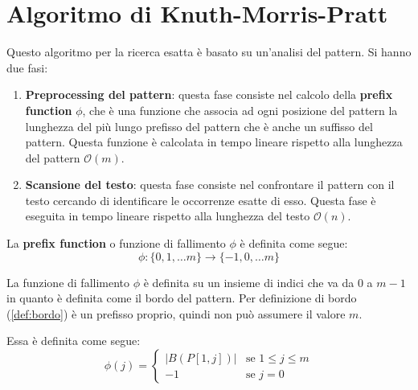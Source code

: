 \section{Algoritmo di Knuth-Morris-Pratt}
Questo algoritmo per la ricerca esatta è basato su un'analisi del pattern. Si
hanno due fasi:
\begin{enumerate}
    \item \textbf{Preprocessing del pattern}: questa fase consiste nel calcolo
          della \textbf{prefix function} $\phi$, che è una funzione che associa
          ad ogni posizione del pattern la lunghezza del più lungo prefisso del
          pattern che è anche un suffisso del pattern. Questa funzione è calcolata
          in tempo lineare rispetto alla lunghezza del pattern $\mathcal{O}(m)$.
    \item \textbf{Scansione del testo}: questa fase consiste nel confrontare il
          pattern con il testo cercando di identificare le occorrenze esatte di
          esso. Questa fase è eseguita in tempo lineare rispetto alla lunghezza
          del testo $\mathcal{O}(n)$.
\end{enumerate}
La \textbf{prefix function} o funzione di fallimento $\phi$ è definita come segue:
\begin{equation}
    \phi: \{0, 1, \dots m\} \to \{-1, 0, \dots m\}
\end{equation}
\begin{nota}
    La funzione di fallimento $\phi$ è definita su un insieme di indici che va
    da $0$ a $m - 1$ in quanto è definita come il bordo del pattern. Per definizione
    di bordo (\ref{def:bordo}) è un prefisso proprio, quindi non può assumere il
    valore $m$.
\end{nota}
Essa è definita come segue:
\begin{equation}
    \phi(j) = \begin{cases}
        |B(P[1, j])| & \text{se } 1 \leq j \leq m \\
        -1           & \text{se } j = 0
    \end{cases}
\end{equation}
